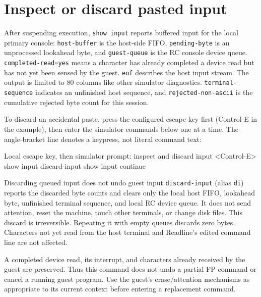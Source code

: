 \section{Inspect or discard pasted input}\label{inspect-or-discard-pasted-input}

After suspending execution, \passthrough{\lstinline!show input!} reports buffered input for the local primary console: \passthrough{\lstinline!host-buffer!} is the host-side FIFO, \passthrough{\lstinline!pending-byte!} is an unprocessed lookahead byte, and \passthrough{\lstinline!guest-queue!} is the RC console device queue. \passthrough{\lstinline!completed-read=yes!} means a character has already completed a device read but has not yet been sensed by the guest. \passthrough{\lstinline!eof!} describes the host input stream. The output is limited to 80 columns like other simulator diagnostics. \passthrough{\lstinline!terminal-sequence!} indicates an unfinished host sequence, and \passthrough{\lstinline!rejected-non-ascii!} is the cumulative rejected byte count for this session.

To discard an accidental paste, press the configured escape key first (Control-E in the example), then enter the simulator commands below one at a time. The angle-bracket line denotes a keypress, not literal command text:

\begin{commandexample}{Local escape key, then simulator prompt: inspect and discard input}
<Control-E>
show input
discard-input
show input
continue
\end{commandexample}

\begin{operationnote}{Discarding queued input does not undo guest input}
\passthrough{\lstinline!discard-input!} (alias \passthrough{\lstinline!di!}) reports the discarded byte counts and clears only the local host FIFO, lookahead byte, unfinished terminal sequence, and local RC device queue. It does not send attention, reset the machine, touch other terminals, or change disk files. This discard is irreversible. Repeating it with empty queues discards zero bytes. Characters not yet read from the host terminal and Readline's edited command line are not affected.

A completed device read, its interrupt, and characters already received by the guest are preserved. Thus this command does not undo a partial FP command or cancel a running guest program. Use the guest's erase/attention mechanisms as appropriate to its current context before entering a replacement command.
\end{operationnote}

